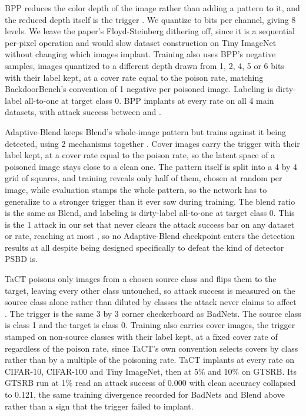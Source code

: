 BPP reduces the color depth of the image rather than adding a pattern to it, and the reduced depth itself is the trigger \cite{wang2022bpp}. We quantize to \AttackBppBitDepth{} bits per channel, giving 8 levels. We leave the paper's Floyd-Steinberg dithering off, since it is a sequential per-pixel operation and would slow dataset construction on Tiny ImageNet without changing which images implant. Training also uses BPP's negative samples, images quantized to a different depth drawn from 1, 2, 4, 5 or 6 bits with their label kept, at a cover rate equal to the poison rate, matching BackdoorBench's convention of 1 negative per poisoned image. Labeling is dirty-label all-to-one at target class 0. BPP implants at every rate on all 4 main datasets, with attack success between \AttackBppAsrMin{} and \AttackBppAsrMax{}.

Adaptive-Blend keeps Blend's whole-image pattern but trains against it being detected, using 2 mechanisms together \cite{qi2023adaptive}. Cover images carry the trigger with their label kept, at a cover rate equal to the poison rate, so the latent space of a poisoned image stays close to a clean one. The pattern itself is split into a 4 by 4 grid of squares, and training reveals only half of them, chosen at random per image, while evaluation stamps the whole pattern, so the network has to generalize to a stronger trigger than it ever saw during training. The blend ratio is the same \AttackAdaptiveBlendAlpha{} as Blend, and labeling is dirty-label all-to-one at target class 0. This is the 1 attack in our set that never clears the attack success bar on any dataset or rate, reaching at most \AttackAdaptiveBlendAsrMax{}, so no Adaptive-Blend checkpoint enters the detection results at all despite being designed specifically to defeat the kind of detector PSBD is.

TaCT poisons only images from a chosen source class and flips them to the target, leaving every other class untouched, so attack success is measured on the source class alone rather than diluted by classes the attack never claims to affect \cite{tang2021demon}. The trigger is the same 3 by 3 corner checkerboard as BadNets. The source class is class 1 and the target is class 0. Training also carries cover images, the trigger stamped on non-source classes with their label kept, at a fixed cover rate of \AttackTactCoverRate{} regardless of the poison rate, since TaCT's own convention selects covers by class rather than by a multiple of the poisoning rate. TaCT implants at every rate on CIFAR-10, CIFAR-100 and Tiny ImageNet, then at 5\% and 10\% on GTSRB. Its GTSRB run at 1\% read an attack success of 0.000 with clean accuracy collapsed to 0.121, the same training divergence recorded for BadNets and Blend above rather than a sign that the trigger failed to implant.

